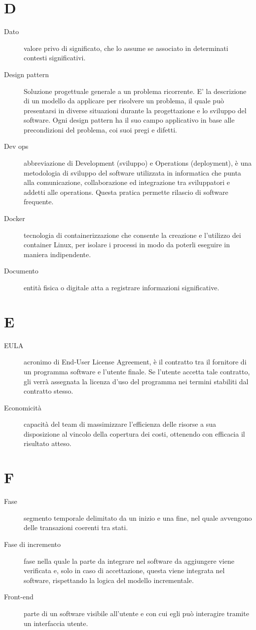 \documentclass{article}
\begin{document}
\section{D}
\begin{description}
  \item[Dato] valore privo di significato, che lo assume se associato in determinati contesti significativi.
  \item[Design pattern] Soluzione progettuale generale a un problema ricorrente. E' la descrizione di un modello da applicare per risolvere un problema, il quale può presentarsi in diverse situazioni durante la progettazione e lo sviluppo del software. Ogni design pattern ha il suo campo applicativo in base alle precondizioni del problema, coi suoi pregi e difetti.
  \item[Dev ops] abbreviazione di Development (sviluppo) e Operations (deployment), è una metodologia di sviluppo del software utilizzata in informatica che punta alla comunicazione, collaborazione ed integrazione tra sviluppatori e addetti alle operations. Questa pratica permette rilascio di software frequente.
  \item[Docker] tecnologia di containerizzazione che consente la creazione e l'utilizzo dei container Linux, per isolare i processi in modo da poterli eseguire in maniera indipendente.
  \item[Documento] entità fisica o digitale atta a registrare informazioni significative.
\end{description}
\newpage
\section{E}
\begin{description}
  \item[EULA] acronimo di End-User License Agreement, è il contratto tra il fornitore di un programma software e l'utente finale. Se l'utente accetta tale contratto, gli verrà assegnata la licenza d'uso del programma nei termini stabiliti dal contratto stesso.
  \item[Economicità] capacità del team di massimizzare l'efficienza delle risorse a sua disposizione al vincolo della copertura dei costi, ottenendo con efficacia il risultato atteso.
\end{description}
\newpage
\section{F}
\begin{description}
  \item[Fase] segmento temporale delimitato da un inizio e una fine, nel quale avvengono delle transazioni coerenti tra stati.
  \item[Fase di incremento] fase nella quale la parte da integrare nel software da aggiungere viene verificata e, solo in caso di accettazione, questa viene integrata nel software, rispettando la logica del modello incrementale.
  \item[Front-end] parte di un software visibile all'utente e con cui egli può interagire tramite un interfaccia utente.
\end{description}
\newpage
\end{document}

